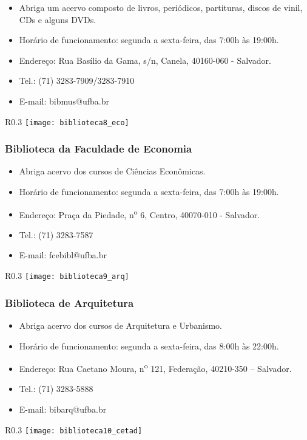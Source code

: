         \begin{itemize}
            \item Abriga um acervo composto de livros, periódicos, partituras, discos de vinil, CDs e alguns DVDs.
            \item Horário de funcionamento: segunda a sexta-feira, das 7:00h às 19:00h.
            \item Endereço: Rua Basílio da Gama, s/n, Canela, 40160-060 - Salvador.
            \item Tel.: (71) 3283-7909/3283-7910
            \item E-mail: bibmus@ufba.br
        \end{itemize}
        \begin{wrapfigure}{R}{0.3\textwidth}
            \centering
            \texttt{[image: biblioteca8\_eco]}
        \end{wrapfigure}
    \subsubsection{Biblioteca da Faculdade de Economia}
        \begin{itemize}
            \item Abriga acervo dos cursos de Ciências Econômicas.
            \item Horário de funcionamento: segunda a sexta-feira, das 7:00h às 19:00h.
            \item Endereço: Praça da Piedade, n\textsuperscript{o} 6, Centro, 40070-010 - Salvador.
            \item Tel.: (71) 3283-7587
            \item E-mail: fcebibl@ufba.br
        \end{itemize}
        \begin{wrapfigure}{R}{0.3\textwidth}
            \centering
            \texttt{[image: biblioteca9\_arq]}
        \end{wrapfigure}
    
    \subsubsection{Biblioteca de Arquitetura}
        \begin{itemize}
            \item Abriga acervo dos cursos de Arquitetura e Urbanismo.
            \item Horário de funcionamento: segunda a sexta-feira, das 8:00h às 22:00h.
            \item Endereço: Rua Caetano Moura, n\textsuperscript{o} 121, Federação, 40210-350 – Salvador.
            \item Tel.: (71) 3283-5888
            \item E-mail: bibarq@ufba.br
        \end{itemize}
        \begin{wrapfigure}{R}{0.3\textwidth}
            \centering
            \texttt{[image: biblioteca10\_cetad]}
        \end{wrapfigure}
